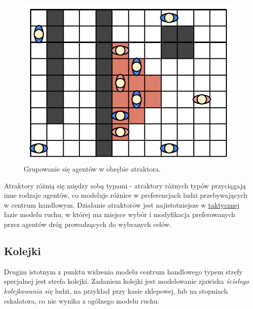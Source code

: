 \documentclass[a4paper, 12pt]{article}
\begin{document}
    \begin{figure}[H]
        \centering
        \includegraphics[scale=0.4]{./img/Crowding.pdf}
        \caption{Grupowanie się agentów w obrębie atraktora.}
        \label{fig:crowding}
    \end{figure}

Atraktory różnią się między sobą typami - atraktory różnych typów przyciągają inne rodzaje agentów, co modeluje różnice w preferencjach ludzi przebywających w centrum handlowym. Działanie atraktorów jest najistotniejsze w \hyperref[sec:tactical]{taktycznej} fazie modelu ruchu, w której ma miejsce wybór i modyfikacja preferowanych przez agentów dróg prowadzących do wybranych celów.

    \subsection{Kolejki}
    \label{sec:queues}

Drugim istotnym z punktu widzenia modelu centrum handlowego typem strefy specjalnej jest strefa kolejki. Zadaniem kolejki jest modelowanie zjawiska \emph{ścisłego kolejkowania się} ludzi, na przykład przy kasie sklepowej, lub na stopniach eskalatora, co nie wynika z ogólnego modelu ruchu.
\end{document}
